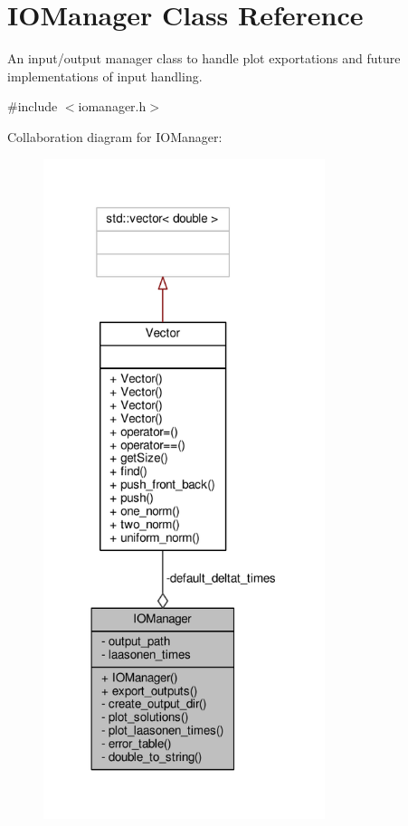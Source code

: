 \hypertarget{classIOManager}{}\section{I\+O\+Manager Class Reference}
\label{classIOManager}


An input/output manager class to handle plot exportations and future implementations of input handling.  




{\ttfamily \#include $<$iomanager.\+h$>$}



Collaboration diagram for I\+O\+Manager\+:
\nopagebreak
\begin{figure}[H]
\begin{center}
\leavevmode
\includegraphics[width=233pt]{classIOManager__coll__graph}
\end{center}
\end{figure}
